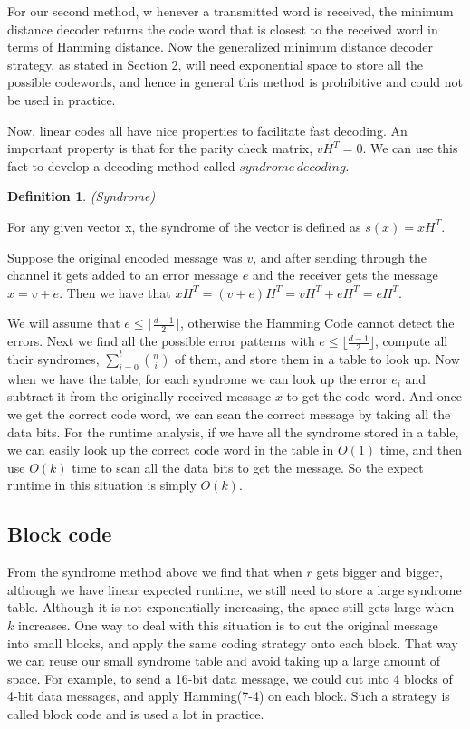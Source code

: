 \documentclass{article}
\newtheorem{Definition}{Definition}
\begin{document}
For our second method, w henever a transmitted word is received, the minimum distance decoder returns the code word that is closest to the received word in terms of Hamming distance. Now the generalized minimum distance decoder strategy, as stated in Section 2, will need exponential space to store all the possible codewords, and hence in general this method is prohibitive and could not be used in practice.

Now, linear codes all have nice properties to facilitate fast decoding. An important property is that for the parity check matrix,  $vH^T = 0$. We can use this fact to develop a decoding method called $syndrome\, decoding$.\\
\begin{Definition}(Syndrome)\end{Definition}
\noindent For any given vector x, the syndrome of the vector is defined as $s(x) = xH^T$.

Suppose the original encoded message was $v$, and after sending through the channel it gets added to an error message $e$ and the receiver gets the message $x = v+e$. Then we have that $xH^T = (v+e)H^T = vH^T+eH^T = eH^T$. 

We will assume that $e \leq \lfloor \frac{d - 1}{2} \rfloor$, otherwise the Hamming Code cannot detect the errors. Next we find all the possible error patterns with $e \leq \lfloor \frac{d - 1}{2} \rfloor$, compute all their syndromes, $ \sum_{i=0}^{t}{n \choose i} $ of them, and store them in a table to look up. Now when we have the table, for each syndrome we can look up the error $e_i$ and subtract it from the originally received message $x$ to get the code word. And once we get the correct code word, we can scan the correct message by taking all the data bits. For the runtime analysis, if we have all the syndrome stored in a table, we can easily look up the correct code word in the table in $O(1)$ time, and then use $O(k)$ time to scan all the data bits to get the message. So the expect runtime in this situation is simply $O(k)$.\\
\subsection{Block code}
From the syndrome method above we find that when $r$ gets bigger and bigger, although we have linear expected runtime, we still need to store a large syndrome table. Although it is not exponentially increasing, the space still gets large when $k$ increases. One way to deal with this situation is to cut the original message into small blocks, and apply the same coding strategy onto each block. That way we can reuse our small syndrome table and avoid taking up a large amount of space. For example, to send a 16-bit data message, we could cut into 4 blocks of 4-bit data messages, and apply  Hamming(7-4) on each block. Such a strategy is called block code and is used a lot in practice.
\end{document}
